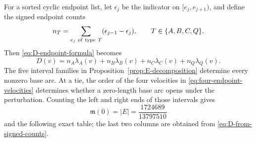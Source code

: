 \documentclass[11pt,reqno,letterpaper]{amsart}
\numberwithin{equation}{section}
\theoremstyle{definition}
\theoremstyle{remark}
\begin{document}
For a sorted cyclic endpoint list, let \(\epsilon_j\) be the indicator
on \([e_j,e_{j+1})\), and define the signed endpoint counts
\begin{equation}\label{eq:signed-endpoint-counts}
 n_T=\sum_{e_j\ {\rm of\ type}\ T}(\epsilon_{j-1}-\epsilon_j),
 \qquad T\in\{A,B,C,Q\}.
\end{equation}
Then \eqref{eq:D-endpoint-formula} becomes
\begin{equation}\label{eq:D-from-signed-counts}
 D(v)=n_A\lambda_A(v)+n_B\lambda_B(v)
      +n_C\lambda_C(v)+n_Q\lambda_Q(v).
\end{equation}
The five interval families in Proposition~\ref{prop:E-decomposition}
determine every nonzero base arc.  At a tie, the order of the four
velocities in \eqref{eq:four-endpoint-velocities} determines whether a
zero-length base arc opens under the perturbation.  Counting the left and
right ends of those intervals gives
\[
 \mathfrak m(0)=|E|=\frac{1724689}{13797510}
\]
and the following exact table; the last two columns are obtained from
\eqref{eq:D-from-signed-counts}.
\end{document}
